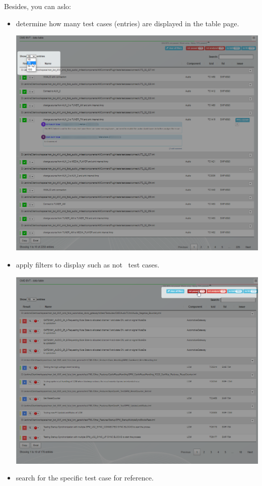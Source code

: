 Besides, you can aslo:
\begin{itemize}
   \item determine how many test cases (entries) are displayed in the table page.

         \includegraphics[width=0.9\linewidth]
         {./pictures/datatable/change_number_entries.png}

   \item apply filters to display such as not \passed\ test cases.

         \includegraphics[width=0.9\linewidth]
         {./pictures/datatable/apply_filter.png}

   \item search for the specific test case for reference.


\end{itemize}
